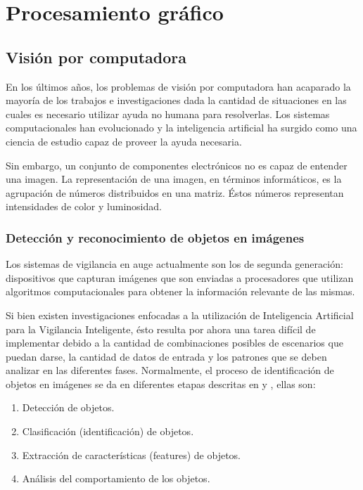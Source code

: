 \documentclass[a4paper,12pt,oneside,spanish]{book}
\begin{document}
\newpage
\chapter{Procesamiento gráfico}
\section{Visión por computadora}

En los últimos años, los problemas de visión por computadora han acaparado la mayoría de los trabajos e investigaciones dada la cantidad de situaciones en las cuales es necesario utilizar ayuda no humana para resolverlas. Los sistemas computacionales han evolucionado y la inteligencia artificial ha surgido como una ciencia de estudio capaz de proveer la ayuda necesaria. \par

Sin embargo, un conjunto de componentes electrónicos no es capaz de entender una imagen. La representación de una imagen, en términos informáticos, es la agrupación de números distribuidos en una matriz. Éstos números representan intensidades de color y luminosidad.\par

\subsection{Detección y reconocimiento de objetos en imágenes}

Los sistemas de vigilancia en auge actualmente son los de segunda generación: dispositivos que capturan imágenes que son enviadas a procesadores que utilizan algoritmos computacionales para obtener la información relevante de las mismas. \par

Si bien existen investigaciones enfocadas a la utilización de Inteligencia Artificial para la Vigilancia Inteligente, ésto resulta por ahora una tarea difícil de implementar debido a la cantidad de combinaciones posibles de escenarios que puedan darse, la cantidad de datos de entrada y los patrones que se deben analizar en las diferentes fases. Normalmente, el proceso de identificación de objetos en imágenes se da en diferentes etapas descritas en \cite{lozano} y \cite{kamarudin}, ellas son:	
\begin{enumerate}
	\baselineskip 10pt
	\item Detección de objetos.\\	
	\item Clasificación (identificación) de objetos.\\
	\item Extracción de características (features) de objetos.\\
	\item Análisis del comportamiento de los objetos.\\
\end{enumerate}	\baselineskip 16pt
\end{document}
